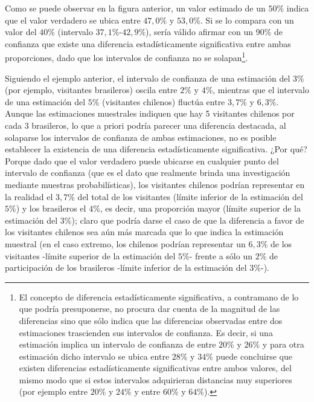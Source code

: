 \documentclass[
]{book}
\begin{document}
Como se puede observar en la figura anterior, un valor estimado de un \(50\%\) indica que el valor verdadero se ubica entre \(47,0\%\) y \(53,0\%\). Si se lo compara con un valor del \(40\%\) (intervalo \(37,1\%\)-\(42,9\%\)), sería válido afirmar con un \(90\%\) de confianza que existe una diferencia estadísticamente significativa entre ambas proporciones, dado que los intervalos de confianza no se solapan\footnote{El concepto de diferencia estadísticamente significativa, a contramano de lo que podría presuponerse, no procura dar cuenta de la magnitud de las diferencias sino que sólo indica que las diferencias observadas entre dos estimaciones trascienden sus intervalos de confianza. Es decir, si una estimación implica un intervalo de confianza de entre \(20\%\) y \(26\%\) y para otra estimación dicho intervalo se ubica entre \(28\%\) y \(34\%\) puede concluirse que existen diferencias estadísticamente significativas entre ambos valores, del mismo modo que si estos intervalos adquirieran distancias muy superiores (por ejemplo entre \(20\%\) y \(24\%\) y entre \(60\%\) y \(64\%\)).}.

Siguiendo el ejemplo anterior, el intervalo de confianza de una estimación del \(3\%\) (por ejemplo, visitantes brasileros) oscila entre \(2\%\) y \(4\%\), mientras que el intervalo de una estimación del \(5\%\) (visitantes chilenos) fluctúa entre \(3,7\%\) y \(6,3\%\). Aunque las estimaciones muestrales indiquen que hay 5 visitantes chilenos por cada 3 brasileros, lo que a priori podría parecer una diferencia destacada, al solaparse los intervalos de confianza de ambas estimaciones, no es posible establecer la existencia de una diferencia estadísticamente significativa. ¿Por qué? Porque dado que el valor verdadero puede ubicarse en cualquier punto del intervalo de confianza (que es el dato que realmente brinda una investigación mediante muestras probabilísticas), los visitantes chilenos podrían representar en la realidad el \(3,7\%\) del total de los visitantes (límite inferior de la estimación del \(5\%\)) y los brasileros el \(4\%\), es decir, una proporción mayor (límite superior de la estimación del \(3\%\)); claro que podría darse el caso de que la diferencia a favor de los visitantes chilenos sea aún más marcada que lo que indica la estimación muestral (en el caso extremo, los chilenos podrían representar un \(6,3\%\) de los visitantes -límite superior de la estimación del \(5\%\)- frente a sólo un \(2\%\) de participación de los brasileros -límite inferior de la estimación del \(3\%\)-).
\end{document}
